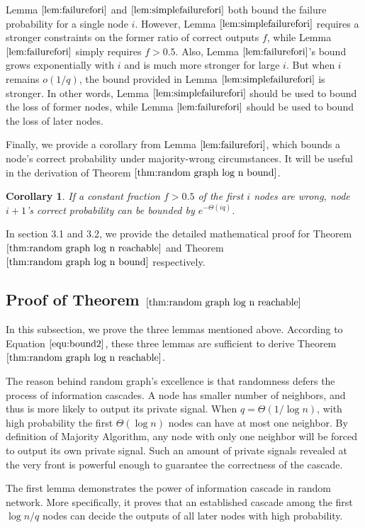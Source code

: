 \documentclass[a4paper,UKenglish]{lipics}
\newtheorem{cor}[thm]{Corollary}
\theoremstyle{definition}
\begin{document}
Lemma $\ref{lem:failurefori}$ and $\ref{lem:simplefailurefori}$ 
	both bound the failure probability for a single node $i$.
However, Lemma $\ref{lem:simplefailurefori}$ requires a stronger constraints on the former ratio of correct outputs $f$,
	while Lemma $\ref{lem:failurefori}$ simply requires $f > 0.5$.
Also, Lemma $\ref{lem:failurefori}$'s bound grows exponentially with $i$ and is much more stronger for large $i$.
But when $i$ remains $o(1/q)$, the bound provided in Lemma $\ref{lem:simplefailurefori}$ is stronger.
In other words, Lemma $\ref{lem:simplefailurefori}$ should be used to bound the loss of former nodes, 
	while Lemma $\ref{lem:failurefori}$ should be used to bound the loss of later nodes.
	
Finally, we provide a corollary from Lemma $\ref{lem:failurefori}$,
	which bounds a node's correct probability under majority-wrong circumstances.
It will be useful in the derivation of Theorem $\ref{thm:random graph log n bound}$.
\begin{cor}
\label {cor:successfori}
If a constant fraction $f > 0.5$ of the first $i$ nodes are wrong, 
	node $i+1$'s correct probability can be bounded by $e^{-\Theta(iq)}$. 
\end{cor}
In section 3.1 and 3.2, we provide the detailed mathematical proof for 
	Theorem $\ref{thm:random graph log n reachable}$ and Theorem $\ref{thm:random graph log n bound}$ respectively.




\subsection {Proof of Theorem $\ref{thm:random graph log n reachable}$}
In this subsection, we prove the three lemmas mentioned above.
According to Equation $\eqref{equ:bound2}$, these three lemmas are sufficient to derive Theorem $\ref{thm:random graph log n reachable}$.

The reason behind random graph's excellence is that randomness defers the process of information cascades.
A node has smaller number of neighbors, and thus is more likely to output its private signal.
When $q = \Theta(1/ \log n)$, with high probability the first $\Theta(\log n)$ nodes can have at most one neighbor.
By definition of Majority Algorithm, any node with only one neighbor will be forced to output its own private signal.
Such an amount of private signals revealed at the very front is powerful enough to guarantee the correctness of the cascade.

The first lemma demonstrates the power of information cascade in random network.
More specifically, it proves that an established cascade among the first $\log n / q$ nodes can decide the outputs of all later nodes with high probability.
\end{document}
